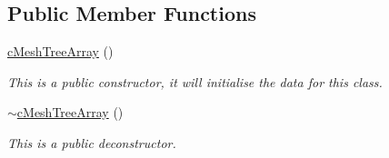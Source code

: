 \subsection*{Public Member Functions}
\begin{DoxyCompactItemize}
\item 
\hypertarget{classc_mesh_tree_array_af8f0a2e58b086a46e5dd12aca2310377}{
\hyperlink{classc_mesh_tree_array_af8f0a2e58b086a46e5dd12aca2310377}{cMeshTreeArray} ()}
\label{classc_mesh_tree_array_af8f0a2e58b086a46e5dd12aca2310377}

\begin{DoxyCompactList}\small\item\em This is a public constructor, it will initialise the data for this class. \end{DoxyCompactList}\item 
\hypertarget{classc_mesh_tree_array_a98917f5d6920454275acf420d78e3f25}{
\hyperlink{classc_mesh_tree_array_a98917f5d6920454275acf420d78e3f25}{$\sim$cMeshTreeArray} ()}
\label{classc_mesh_tree_array_a98917f5d6920454275acf420d78e3f25}

\begin{DoxyCompactList}\small\item\em This is a public deconstructor. \end{DoxyCompactList}\end{DoxyCompactItemize}
